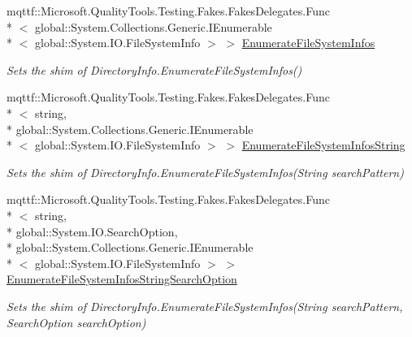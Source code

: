 \begin{DoxyCompactItemize}
mqttf\-::\-Microsoft.\-Quality\-Tools.\-Testing.\-Fakes.\-Fakes\-Delegates.\-Func\\*
$<$ global\-::\-System.\-Collections.\-Generic.\-I\-Enumerable\\*
$<$ global\-::\-System.\-I\-O.\-File\-System\-Info $>$ $>$ \hyperlink{class_system_1_1_i_o_1_1_fakes_1_1_shim_directory_info_aaf0d661a496343c611b2e1338334ede2}{Enumerate\-File\-System\-Infos}
\begin{DoxyCompactList}\small\item\em Sets the shim of Directory\-Info.\-Enumerate\-File\-System\-Infos()\end{DoxyCompactList}\item 
mqttf\-::\-Microsoft.\-Quality\-Tools.\-Testing.\-Fakes.\-Fakes\-Delegates.\-Func\\*
$<$ string, \\*
global\-::\-System.\-Collections.\-Generic.\-I\-Enumerable\\*
$<$ global\-::\-System.\-I\-O.\-File\-System\-Info $>$ $>$ \hyperlink{class_system_1_1_i_o_1_1_fakes_1_1_shim_directory_info_a095c429ab8c8b32c1be6296702a5ed7e}{Enumerate\-File\-System\-Infos\-String}
\begin{DoxyCompactList}\small\item\em Sets the shim of Directory\-Info.\-Enumerate\-File\-System\-Infos(\-String search\-Pattern)\end{DoxyCompactList}\item 
mqttf\-::\-Microsoft.\-Quality\-Tools.\-Testing.\-Fakes.\-Fakes\-Delegates.\-Func\\*
$<$ string, \\*
global\-::\-System.\-I\-O.\-Search\-Option, \\*
global\-::\-System.\-Collections.\-Generic.\-I\-Enumerable\\*
$<$ global\-::\-System.\-I\-O.\-File\-System\-Info $>$ $>$ \hyperlink{class_system_1_1_i_o_1_1_fakes_1_1_shim_directory_info_ab676875f6f12050d469cdeb650141f13}{Enumerate\-File\-System\-Infos\-String\-Search\-Option}
\begin{DoxyCompactList}\small\item\em Sets the shim of Directory\-Info.\-Enumerate\-File\-System\-Infos(\-String search\-Pattern, Search\-Option search\-Option)\end{DoxyCompactList}\item 

\end{DoxyCompactItemize}
